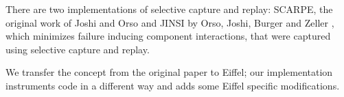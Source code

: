 There are two implementations of selective capture and replay: SCARPE, the original work of Joshi and Orso \cite{orso05may} and JINSI by Orso, Joshi, Burger and Zeller \cite{JINSI}, which minimizes failure inducing component interactions, that were captured using selective capture and replay.

We transfer the concept from the original paper \cite{orso05may} to Eiffel; our implementation instruments code in a different way and adds some Eiffel specific modifications.